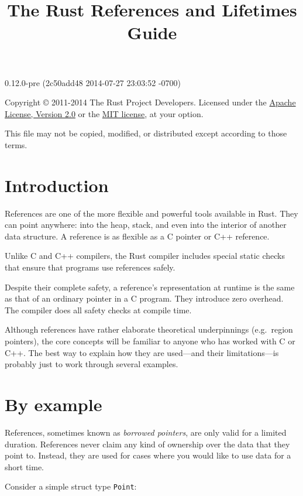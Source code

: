 \documentclass[]{article}
\title{The Rust References and Lifetimes Guide}
\begin{document}
\maketitle

0.12.0-pre (2c50add48 2014-07-27 23:03:52 -0700)

Copyright © 2011-2014 The Rust Project Developers. Licensed under the
\href{http://www.apache.org/licenses/LICENSE-2.0}{Apache License,
Version 2.0} or the \href{http://opensource.org/licenses/MIT}{MIT
license}, at your option.

This file may not be copied, modified, or distributed except according
to those terms.

{
\hypersetup{linkcolor=black}
\setcounter{tocdepth}{3}
\tableofcontents
}
\section{Introduction}\label{introduction}

References are one of the more flexible and powerful tools available in
Rust. They can point anywhere: into the heap, stack, and even into the
interior of another data structure. A reference is as flexible as a C
pointer or C++ reference.

Unlike C and C++ compilers, the Rust compiler includes special static
checks that ensure that programs use references safely.

Despite their complete safety, a reference's representation at runtime
is the same as that of an ordinary pointer in a C program. They
introduce zero overhead. The compiler does all safety checks at compile
time.

Although references have rather elaborate theoretical underpinnings
(e.g.~region pointers), the core concepts will be familiar to anyone who
has worked with C or C++. The best way to explain how they are
used---and their limitations---is probably just to work through several
examples.

\section{By example}\label{by-example}

References, sometimes known as \emph{borrowed pointers}, are only valid
for a limited duration. References never claim any kind of ownership
over the data that they point to. Instead, they are used for cases where
you would like to use data for a short time.

Consider a simple struct type \texttt{Point}:
\end{document}
